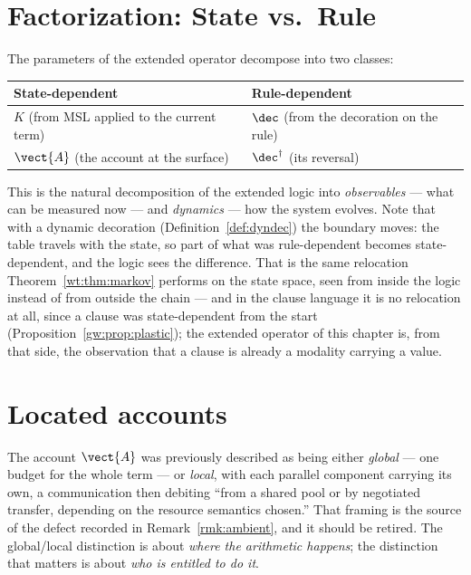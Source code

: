 \section{Factorization: State vs.\ Rule}

The parameters of the extended operator decompose into two classes:

\begin{center}
\begin{tabular}{ll}
\toprule
\textbf{State-dependent} & \textbf{Rule-dependent} \\
\midrule
$K$ (from MSL applied to the current term) & $\dec$ (from the decoration on the rule) \\
$\vect{A}$ (the account at the surface) & $\dec^{\dagger}$ (its reversal) \\
\bottomrule
\end{tabular}
\end{center}

This is the natural decomposition of the extended logic into
\emph{observables} --- what can be measured now --- and \emph{dynamics} ---
how the system evolves.  Note that with a dynamic decoration
(Definition~\ref{def:dyndec}) the boundary moves: the table travels with
the state, so part of what was rule-dependent becomes state-dependent, and
the logic sees the difference.  That is the same relocation
Theorem~\ref{wt:thm:markov} performs on the state space, seen from inside
the logic instead of from outside the chain --- and in the clause
language it is no relocation at all, since a clause was state-dependent
from the start (Proposition~\ref{gw:prop:plastic}); the extended operator
of this chapter is, from that side, the observation that a clause is
already a modality carrying a value.

\section{Located accounts}

The account $\vect{A}$ was previously described as being either
\emph{global} --- one budget for the whole term --- or \emph{local}, with
each parallel component carrying its own, a communication then debiting
``from a shared pool or by negotiated transfer, depending on the resource
semantics chosen.''  That framing is the source of the defect recorded in
Remark~\ref{rmk:ambient}, and it should be retired.  The global/local
distinction is about \emph{where the arithmetic happens}; the distinction
that matters is about \emph{who is entitled to do it}.


